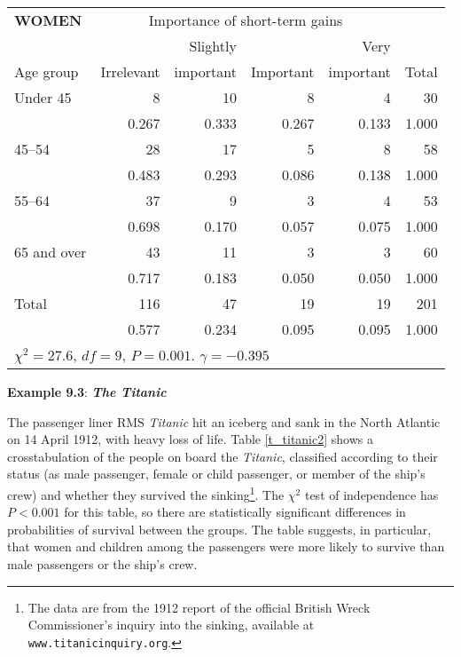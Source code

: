 \begin{table}[t]
\begin{center}
\begin{tabular}{|l|rrrr|r|}\hline
\textbf{WOMEN}& \multicolumn{4}{|c|}{Importance of short-term gains } & \\
 & & Slightly & & Very & \\
Age group & Irrelevant & important & Important & important & Total \\ \hline
Under 45 &  8 &  10 &  8 &  4 & 30 \\
& 0.267 & 0.333 & 0.267 & 0.133 & 1.000 \\
45--54 &  28 &  17 &  5 &  8 & 58 \\
& 0.483 & 0.293 & 0.086 & 0.138 & 1.000 \\
55--64 & 37 &  9 &  3 &  4 & 53 \\
& 0.698 & 0.170 & 0.057 & 0.075 & 1.000 \\
65 and over &  43 &  11 &  3 &  3 & 60 \\
& 0.717 & 0.183 & 0.050 & 0.050 & 1.000 \\
\hline
Total & 116 & 47 & 19 & 19 & 201 \\
& 0.577 & 0.234 & 0.095 & 0.095 & 1.000 \\
\hline
\multicolumn{6}{l}{$\chi^{2}=27.6$, $df=9$, $P=0.001$.
$\gamma=-0.395$}
\end{tabular}
\end{center}
\end{table}

\textbf{Example 9.3}: \textbf{\emph{The Titanic}}

The passenger liner RMS \emph{Titanic} hit an iceberg and sank in the
North Atlantic on 14 April 1912, with heavy loss of life. Table
\ref{t_titanic2} shows a crosstabulation of the people on board the
\emph{Titanic}, classified according to their status (as male passenger,
female or child passenger, or member of the ship's crew) and whether
they survived the sinking\footnote{The data are from the 1912 report of
the official British Wreck Commissioner's inquiry into the sinking,
available at \texttt{www.titanicinquiry.org}.}. The $\chi^{2}$ test of
independence has $P<0.001$ for this table, so there are statistically
significant differences in probabilities of survival between the groups.
The table suggests, in particular,
that women and children among the passengers were more likely to survive than male
passengers or the ship's crew.

